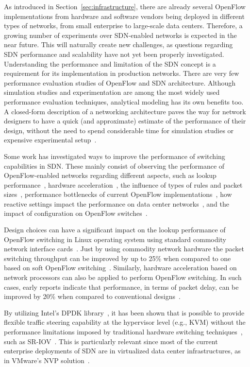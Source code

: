 As introduced in Section~\ref{sec:infrastructure}, there are already several OpenFlow implementations from 
hardware and software vendors being deployed in different types of networks, from small enterprise 
to large-scale data centers. Therefore, a growing number of experiments over SDN-enabled networks is expected 
in the near future. This will naturally create new challenges, as questions regarding SDN performance and 
scalability have not yet been properly investigated. Understanding the performance and limitation of the SDN 
concept is a requirement for its implementation in production networks. There are very few performance 
evaluation studies of OpenFlow and SDN architecture. Although simulation studies and experimentation are 
among the most widely used performance evaluation techniques, analytical modeling has its own benefits too. 
A closed-form description of a networking architecture paves the way for network designers to have a quick 
(and approximate) estimate of the performance of their design, without the need to spend considerable time 
for simulation studies or expensive experimental setup~\cite{Kobayashi2014151}.

Some work has investigated ways to improve the performance of switching capabilities in SDN.
These mainly consist of observing the performance of OpenFlow-enabled networks regarding different aspects, such as lookup performance~\cite{jarschel2011}, hardware acceleration~\cite{luo2009}, the influence of types of rules and packet sizes~\cite{bianco2010}, performance bottlenecks of current OpenFlow implementations~\cite{curtis2011}, how reactive settings impact the performance on data center networks~\cite{pries2012}, and the impact of configuration on OpenFlow switches~\cite{sherwood2011}.

Design choices can have a significant impact on the lookup performance of OpenFlow switching in Linux 
operating system using standard commodity network interface cards~\cite{jarschel2011}. 
Just by using commodity network hardware the packet switching throughput can be improved by up to 25\% when compared to one based on soft OpenFlow switching~\cite{jarschel2011}. Similarly, hardware acceleration based on network processors can also be applied to perform OpenFlow switching. 
In such cases, early reports indicate that performance, in terms of packet delay, can be improved by 20\% when compared to conventional designs~\cite{luo2009}.

By utilizing Intel's DPDK library~\cite{intelcorporation2014}, it has been shown that is possible to provide 
flexible traffic steering capability at the hypervisor level (e.g., KVM) without the performance limitations 
imposed by traditional hardware switching techniques~\cite{hwang2014}, such as SR-IOV~\cite{dong2008}.
This is particularly relevant since most of the current enterprise deployments of SDN are in virtualized data 
center infrastructures, as in VMware's NVP solution~\cite{koponen}.

